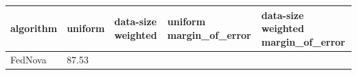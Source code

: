\begin{tabular}{lllll}
\toprule
algorithm & uniform & data-size weighted & uniform margin_of_error & data-size weighted margin_of_error \\
\midrule
FedNova & 87.53%
\bottomrule
\end{tabular}

